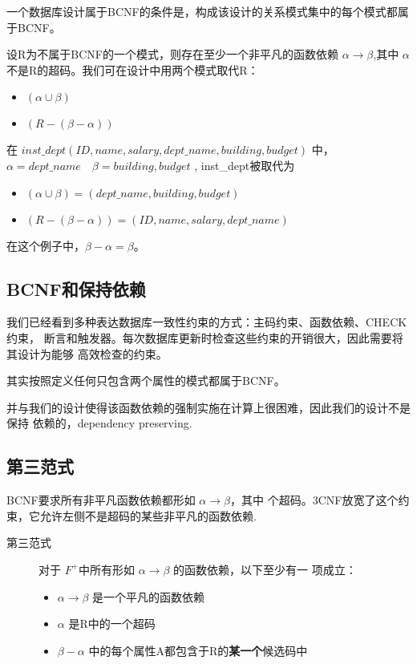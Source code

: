 \documentclass{dingjia}
\begin{document}
一个数据库设计属于BCNF的条件是，构成该设计的关系模式集中的每个模式都属于BCNF。

设R为不属于BCNF的一个模式，则存在至少一个非平凡的函数依赖 $\alpha
\rightarrow \beta$,其中 $\alpha$ 不是R的超码。我们可在设计中用两个模式取代R：
\begin{itemize}
\item $ (\alpha \cup \beta)$
\item $ (R - (\beta - \alpha))$
\end{itemize}

在 $inst\_dept ( ID, name, salary, dept\_name, building, budget)$ 中，
$\alpha = dept\_name \quad \beta = {building, budget}$ , inst\_dept被取代为
\begin{itemize}
\item $(\alpha \cup \beta) = (dept\_name, building, budget)$
\item $(R - (\beta - \alpha)) = (ID, name, salary, dept\_name)$
\end{itemize}
在这个例子中，$\beta - \alpha = \beta$。

\subsection{BCNF和保持依赖}

我们已经看到多种表达数据库一致性约束的方式：主码约束、函数依赖、CHECK约束，
断言和触发器。每次数据库更新时检查这些约束的开销很大，因此需要将其设计为能够
高效检查的约束。

其实按照定义任何只包含两个属性的模式都属于BCNF。

并与我们的设计使得该函数依赖的强制实施在计算上很困难，因此我们的设计不是保持
依赖的，dependency preserving.

\subsection{第三范式}

BCNF要求所有非平凡函数依赖都形如 $\alpha \rightarrow \beta$，其中
个超码。3CNF放宽了这个约束，它允许左侧不是超码的某些非平凡的函数依赖.
\begin{description}
\item[第三范式] 对于 $F^+$中所有形如 $\alpha \rightarrow \beta$ 的函数依赖，以下至少有一
  项成立：
  \begin{itemize}
  \item $\alpha \rightarrow \beta$ 是一个平凡的函数依赖
  \item $\alpha$ 是R中的一个超码
  \item $\beta - \alpha$ 中的每个属性A都包含于R的\textbf{某一个}候选码中
  \end{itemize}
\end{description}
\end{document}
